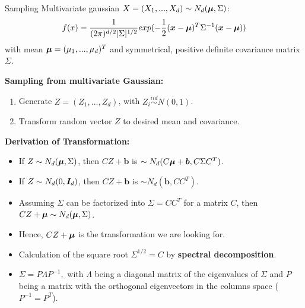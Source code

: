 \documentclass[11pt,compress,t,notes=noshow, xcolor=table]{beamer}
\begin{document}
\begin{vbframe}{Sampling Multivariate gaussian}
$X=(X_1, ..., X_d) \sim N_d(\bm{\mu}, \Sigma)$:
$$
f(x) = \frac{1}{(2\pi)^{d/2} |\Sigma|^{1/2}}exp(-\frac{1}{2}(\bm{x}-\bm{\mu})^T\Sigma^{-1}(\bm{x}-\bm{\mu}))
$$
with mean $\bm{\mu}=(\mu_1,...,\mu_d)^T$ and symmetrical, positive definite covariance matrix $\Sigma$.

\lz

\textbf{Sampling from multivariate Gaussian:}

\lz
\begin{enumerate}
\item Generate $Z=(Z_1,...,Z_d)$, with $Z_i \stackrel{iid}{\sim} N(0,1)$.
\item Transform random vector $Z$ to desired mean and covariance.
\end{enumerate}

\framebreak

\textbf{Derivation of Transformation:}

\lz

\begin{itemize}
\item If $Z \sim N_d(\bm{\mu}, \Sigma)$, then $CZ+\bm{b}$ is $\sim N_d(C\bm{\mu}+\bm{b}, C\Sigma C^T)$.

\lz

\item If $Z \sim N_d(0,\bm{I}_d)$, then $CZ+\bm{b}$ is $\sim N_d(\bm{b}, CC^T)$.

\lz

\item Assuming $\Sigma$ can be factorized into $\Sigma=CC^T$ for a matrix $C$, then $CZ+\bm{\mu} \sim N_d(\bm{\mu}, \Sigma)$.

\lz

\item Hence, $CZ+\bm{\mu}$ is the transformation we are looking for.
\end{itemize}

\framebreak
\begin{itemize}
\item Calculation of the square root $\Sigma^{1/2}=C$ by \textbf{spectral decomposition}.

\lz

\item $\Sigma=P\Lambda P^{-1},$ with $\Lambda$ being a diagonal matrix of the eigenvalues of $\Sigma$ and $P$ being a matrix with the orthogonal eigenvectors in the columns space ($P^{-1}=P^T$).

\lz


\end{itemize}
\end{vbframe}
\end{document}
